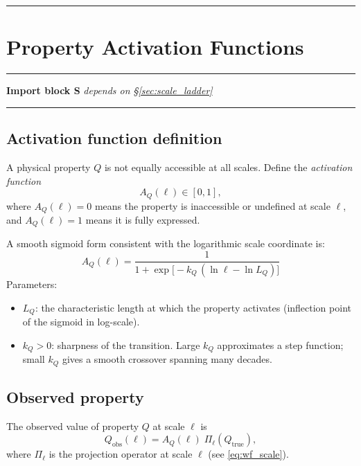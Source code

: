 \documentclass[11pt, a4paper, oneside]{article}
\theoremstyle{definition}
\theoremstyle{plain}
\theoremstyle{remark}
\begin{document}
\noindent\rule{\linewidth}{0.4pt}

\section{Property Activation Functions}
\label{sec:activation}

\noindent\rule{\linewidth}{0.8pt}
\textbf{Import block S} \hfill \textit{depends on \S\ref{sec:scale_ladder}}
\noindent\rule{\linewidth}{0.4pt}

\subsection{Activation function definition}

A physical property $Q$ is not equally accessible at all scales.
Define the \emph{activation function}
\begin{equation}
  A_Q(\ell) \in [0,1],
  \label{eq:AQ_range}
\end{equation}
where $A_Q(\ell) = 0$ means the property is inaccessible or undefined
at scale $\ell$, and $A_Q(\ell) = 1$ means it is fully expressed.

A smooth sigmoid form consistent with the logarithmic scale coordinate is:
\begin{equation}
  \boxed{
    A_Q(\ell)
    = \frac{1}{1 + \exp\bigl[-k_Q\,(\ln\ell - \ln L_Q)\bigr]}
  }
  \label{eq:AQ}
\end{equation}
Parameters:
\begin{itemize}
  \item $L_Q$: the characteristic length at which the property activates
    (inflection point of the sigmoid in log-scale).
  \item $k_Q > 0$: sharpness of the transition.
    Large $k_Q$ approximates a step function; small $k_Q$ gives a
    smooth crossover spanning many decades.
\end{itemize}

\subsection{Observed property}

The observed value of property $Q$ at scale $\ell$ is
\begin{equation}
  Q_\mathrm{obs}(\ell) = A_Q(\ell)\;\Pi_\ell(Q_\mathrm{true}),
  \label{eq:Q_obs}
\end{equation}
where $\Pi_\ell$ is the projection operator at scale $\ell$
(see \eqref{eq:wf_scale}).
\end{document}

